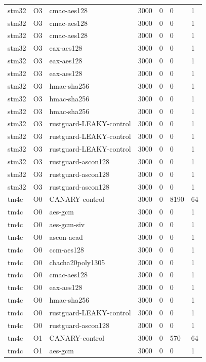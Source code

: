 \begin{table}[t]
\begin{tabular}{lllllll}
    stm32 & O3 & cmac-aes128 & 3000 & 0 & 0 & 1 \\
    stm32 & O3 & cmac-aes128 & 3000 & 0 & 0 & 1 \\
    stm32 & O3 & cmac-aes128 & 3000 & 0 & 0 & 1 \\
    stm32 & O3 & eax-aes128 & 3000 & 0 & 0 & 1 \\
    stm32 & O3 & eax-aes128 & 3000 & 0 & 0 & 1 \\
    stm32 & O3 & eax-aes128 & 3000 & 0 & 0 & 1 \\
    stm32 & O3 & hmac-sha256 & 3000 & 0 & 0 & 1 \\
    stm32 & O3 & hmac-sha256 & 3000 & 0 & 0 & 1 \\
    stm32 & O3 & hmac-sha256 & 3000 & 0 & 0 & 1 \\
    stm32 & O3 & rustguard-LEAKY-control & 3000 & 0 & 0 & 1 \\
    stm32 & O3 & rustguard-LEAKY-control & 3000 & 0 & 0 & 1 \\
    stm32 & O3 & rustguard-LEAKY-control & 3000 & 0 & 0 & 1 \\
    stm32 & O3 & rustguard-ascon128 & 3000 & 0 & 0 & 1 \\
    stm32 & O3 & rustguard-ascon128 & 3000 & 0 & 0 & 1 \\
    stm32 & O3 & rustguard-ascon128 & 3000 & 0 & 0 & 1 \\
    tm4c & O0 & CANARY-control & 3000 & 0 & 8190 & 64 \\
    tm4c & O0 & aes-gcm & 3000 & 0 & 0 & 1 \\
    tm4c & O0 & aes-gcm-siv & 3000 & 0 & 0 & 1 \\
    tm4c & O0 & ascon-aead & 3000 & 0 & 0 & 1 \\
    tm4c & O0 & ccm-aes128 & 3000 & 0 & 0 & 1 \\
    tm4c & O0 & chacha20poly1305 & 3000 & 0 & 0 & 1 \\
    tm4c & O0 & cmac-aes128 & 3000 & 0 & 0 & 1 \\
    tm4c & O0 & eax-aes128 & 3000 & 0 & 0 & 1 \\
    tm4c & O0 & hmac-sha256 & 3000 & 0 & 0 & 1 \\
    tm4c & O0 & rustguard-LEAKY-control & 3000 & 0 & 0 & 1 \\
    tm4c & O0 & rustguard-ascon128 & 3000 & 0 & 0 & 1 \\
    tm4c & O1 & CANARY-control & 3000 & 0 & 570 & 64 \\
    tm4c & O1 & aes-gcm & 3000 & 0 & 0 & 1 \\

\end{tabular}
\end{table}

